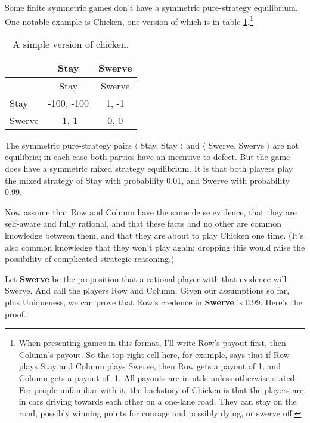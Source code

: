 \documentclass[
  11pt,
]{article}
\begin{document}
Some finite symmetric games don't have a symmetric pure-strategy equilibrium. One notable example is Chicken, one version of which is in table \ref{tab:chicken}.\footnote{When presenting games in this format, I'll write Row's payout first, then Column's payout. So the top right cell here, for example, says that if Row plays Stay and Column plays Swerve, then Row gets a payout of 1, and Column gets a payout of -1. All payouts are in utils unless otherwise stated. For people unfamiliar with it, the backstory of Chicken is that the players are in cars driving towards each other on a one-lane road. They can stay on the road, possibly winning points for courage and possibly dying, or swerve off.}

\begin{longtable}[]{@{}lcc@{}}
\caption{\label{tab:chicken} A simple version of chicken.}\tabularnewline
\toprule\noalign{}
& Stay & Swerve \\
\midrule\noalign{}
\endfirsthead
\toprule\noalign{}
& Stay & Swerve \\
\midrule\noalign{}
\endhead
\bottomrule\noalign{}
\endlastfoot
Stay & -100, -100 & 1, -1 \\
Swerve & -1, 1 & 0, 0 \\
\end{longtable}

The symmetric pure-strategy pairs \(\langle\) Stay, Stay \(\rangle\) and \(\langle\) Swerve, Swerve \(\rangle\) are not equilibria; in each case both parties have an incentive to defect. But the game does have a symmetric mixed strategy equilibrium. It is that both players play the mixed strategy of Stay with probability 0.01, and Swerve with probability 0.99.

Now assume that Row and Column have the same de se evidence, that they are self-aware and fully rational, and that these facts and no other are common knowledge between them, and that they are about to play Chicken one time. (It's also common knowledge that they won't play again; dropping this would raise the possibility of complicated strategic reasoning.)

Let \textbf{Swerve} be the proposition that a rational player with that evidence will Swerve. And call the players Row and Column. Given our assumptions so far, plus Uniqueness, we can prove that Row's credence in \textbf{Swerve} is 0.99. Here's the proof.
\end{document}
